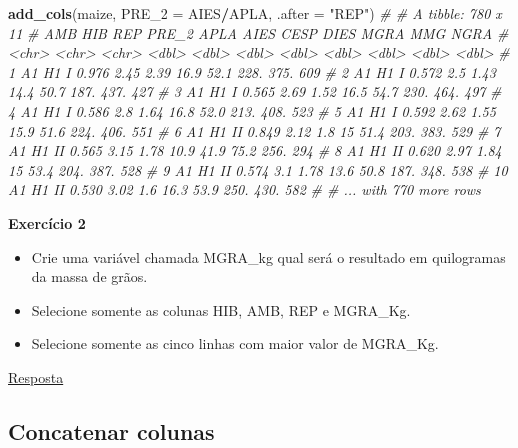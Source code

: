 \documentclass[
]{book}
\newenvironment{Shaded}{\begin{snugshade}}{\end{snugshade}}
\newcommand{\CommentTok}[1]{\textcolor[rgb]{0.56,0.35,0.01}{\textit{#1}}}
\newcommand{\DataTypeTok}[1]{\textcolor[rgb]{0.13,0.29,0.53}{#1}}
\newcommand{\KeywordTok}[1]{\textcolor[rgb]{0.13,0.29,0.53}{\textbf{#1}}}
\newcommand{\NormalTok}[1]{#1}
\newcommand{\OperatorTok}[1]{\textcolor[rgb]{0.81,0.36,0.00}{\textbf{#1}}}
\newcommand{\StringTok}[1]{\textcolor[rgb]{0.31,0.60,0.02}{#1}}
\begin{document}
\begin{Shaded}
\begin{Highlighting}[]

\KeywordTok{add_cols}\NormalTok{(maize,}
         \DataTypeTok{PRE_2 =}\NormalTok{ AIES}\OperatorTok{/}\NormalTok{APLA,}
         \DataTypeTok{.after =} \StringTok{"REP"}\NormalTok{)}
\CommentTok{# # A tibble: 780 x 11}
\CommentTok{#    AMB   HIB   REP   PRE_2  APLA  AIES  CESP  DIES  MGRA   MMG  NGRA}
\CommentTok{#    <chr> <chr> <chr> <dbl> <dbl> <dbl> <dbl> <dbl> <dbl> <dbl> <dbl>}
\CommentTok{#  1 A1    H1    I     0.976  2.45  2.39  16.9  52.1 228.   375.   609}
\CommentTok{#  2 A1    H1    I     0.572  2.5   1.43  14.4  50.7 187.   437.   427}
\CommentTok{#  3 A1    H1    I     0.565  2.69  1.52  16.5  54.7 230.   464.   497}
\CommentTok{#  4 A1    H1    I     0.586  2.8   1.64  16.8  52.0 213.   408.   523}
\CommentTok{#  5 A1    H1    I     0.592  2.62  1.55  15.9  51.6 224.   406.   551}
\CommentTok{#  6 A1    H1    II    0.849  2.12  1.8   15    51.4 203.   383.   529}
\CommentTok{#  7 A1    H1    II    0.565  3.15  1.78  10.9  41.9  75.2  256.   294}
\CommentTok{#  8 A1    H1    II    0.620  2.97  1.84  15    53.4 204.   387.   528}
\CommentTok{#  9 A1    H1    II    0.574  3.1   1.78  13.6  50.8 187.   348.   538}
\CommentTok{# 10 A1    H1    II    0.530  3.02  1.6   16.3  53.9 250.   430.   582}
\CommentTok{# # ... with 770 more rows}
\end{Highlighting}
\end{Shaded}

\begin{tarefa}
\textbf{Exercício 2}

\begin{itemize}
\item
  Crie uma variável chamada MGRA\_kg qual será o resultado em quilogramas da massa de grãos.
\item
  Selecione somente as colunas HIB, AMB, REP e MGRA\_Kg.
\item
  Selecione somente as cinco linhas com maior valor de MGRA\_Kg.
\end{itemize}
\end{tarefa}

\protect\hyperlink{exerc2}{Resposta}

\hypertarget{concatenar-colunas}{%
\subsection{Concatenar colunas}\label{concatenar-colunas}}
\end{document}
